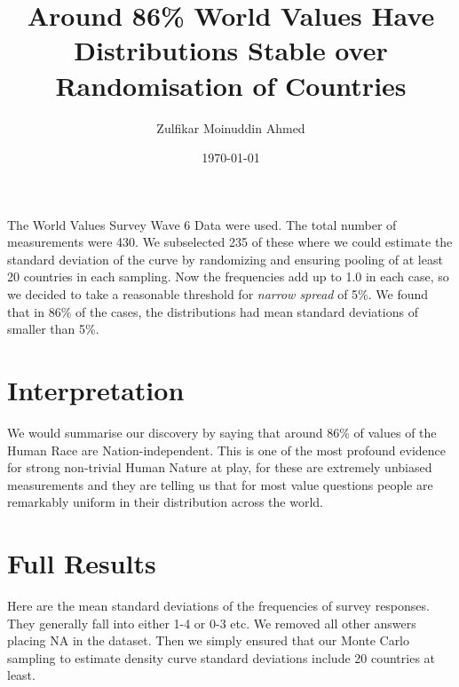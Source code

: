 \documentclass{amsart}
\title{Around 86\% World Values Have Distributions Stable over Randomisation of Countries}
\author{Zulfikar Moinuddin Ahmed}
\date{\today}
\begin{document}
\maketitle

The World Values Survey Wave 6 Data were used.  The total number of measurements were 430.  We subselected 235 of these where we could estimate the standard deviation of the curve by randomizing and ensuring pooling of at least 20 countries in each sampling.  Now the frequencies add up to 1.0 in each case, so we decided to take a reasonable threshold for {\em narrow spread} of 5\%. We found that in 86\% of the cases, the distributions had mean standard deviations of smaller than 5\%.


\section{Interpretation}

We would summarise our discovery by saying that around 86\% of values of the Human Race are Nation-independent.  This is one of the most profound evidence for strong non-trivial Human Nature at play, for these are extremely unbiased measurements and they are telling us that for most value questions people are remarkably uniform in their distribution across the world.

\section{Full Results}

Here are the mean standard deviations of the frequencies of survey responses.  They generally fall into either 1-4 or 0-3 etc.  We removed all other answers placing NA in the dataset.  Then we simply ensured that our Monte Carlo sampling to estimate density curve standard deviations include 20 countries at least.  
\end{document}
